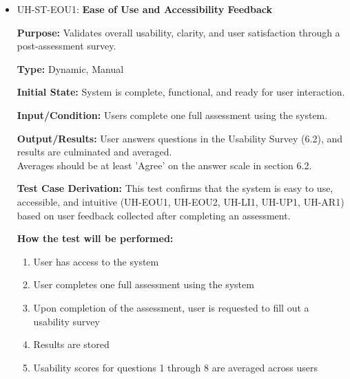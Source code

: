 \documentclass[12pt, titlepage]{article}
\begin{document}
\begin{itemize}
  \item UH-ST-EOU1: \textbf{Ease of Use and Accessibility Feedback}
  \begin{mdframed}[linewidth=0.5mm]
      \textbf{Purpose:} Validates overall usability, clarity, and user satisfaction through a post-assessment survey. \par
      \textbf{Type:} Dynamic, Manual \par
      \textbf{Initial State:} System is complete, functional, and ready for user interaction. \par
      \textbf{Input/Condition:} Users complete one full assessment using the system. \par
      \textbf{Output/Results:} User answers questions in the Usability Survey (6.2), and results are culminated and averaged.\\
      Averages should be at least 'Agree' on the answer scale in section 6.2. \par
      \textbf{Test Case Derivation:} This test confirms that the system is easy to use, accessible, and intuitive (UH-EOU1, UH-EOU2, UH-LI1, UH-UP1, UH-AR1) based on user feedback collected after completing an assessment. \par
      \textbf{How the test will be performed:}
      \begin{enumerate}[noitemsep]
        \item User has access to the system
        \item User completes one full assessment using the system
        \item Upon completion of the assessment, user is requested to fill out a usability survey
        \item Results are stored
        \item Usability scores for questions 1 through 8 are averaged across users
      \end{enumerate}
  \end{mdframed}


\end{itemize}
\end{document}
